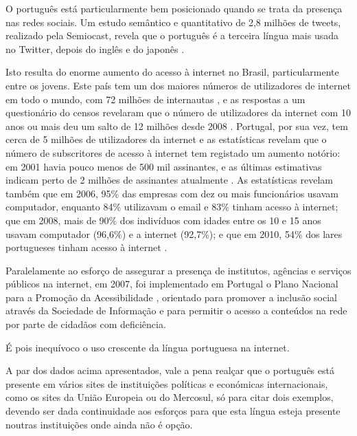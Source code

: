 \begin{multicols}{2}
O português está particularmente bem posicionado quando se trata da presença nas redes sociais. Um estudo semântico e quantitativo de 2,8 milhões de tweets, realizado pela Semiocast, revela que o português é a terceira língua mais usada no Twitter, depois do inglês e do japonês \cite{stat7}.


Isto resulta do enorme aumento do acesso à internet no Brasil, particularmente entre os jovens. 
Este país tem um dos maiores números de utilizadores de internet em todo o mundo,  com 72 milhões de internautas \cite{statop20}, 
e as respostas a um questionário do censos revelaram que o número de utilizadores da internet com 10 anos ou mais deu um salto de 12 milhões desde 2008 \cite{mybroadband}. 
Portugal, por sua vez, tem cerca de 5 milhões de utilizadores da internet  \cite{stat4}  \cite{stat15} e as estatísticas revelam que o número de subscritores de acesso
à internet tem registado um aumento notório: em 2001 havia pouco menos de 500 mil assinantes, 
e as últimas estimativas indicam perto de 2 milhões de assinantes atualmente \cite{pordata}. 
As estatísticas revelam também que
em 2006, 95\% das empresas com dez ou mais funcionários usavam computador, enquanto 84\% utilizavam o email e 83\% tinham acesso à internet;
que em 2008, mais de 90\% dos indivíduos com idades entre os 10 e 15 anos usavam computador (96,6\%) e a internet (92,7\%);
e que em 2010, 54\% dos lares portugueses tinham acesso à internet \cite{pordata}.

Paralelamente ao esforço de assegurar a presença de institutos, agências e serviços públicos na internet, 
em 2007, foi implementado em Portugal o Plano Nacional para a Promoção da Acessibilidade \cite{umic},
orientado para promover a inclusão social através da Sociedade de Informação e para permitir o acesso a conteúdos 
na rede por parte de cidadãos com deficiência.

É pois inequívoco o uso crescente da língua portuguesa na internet. 

A par dos dados acima apresentados, vale a pena realçar que o português está presente em vários sites de instituições políticas e económicas internacionais, 
como os sites da União Europeia ou do Mercosul, só para citar dois exemplos, 
devendo ser dada continuidade aos esforços para que esta língua esteja presente noutras instituições onde ainda não é opção.

\end{multicols}


